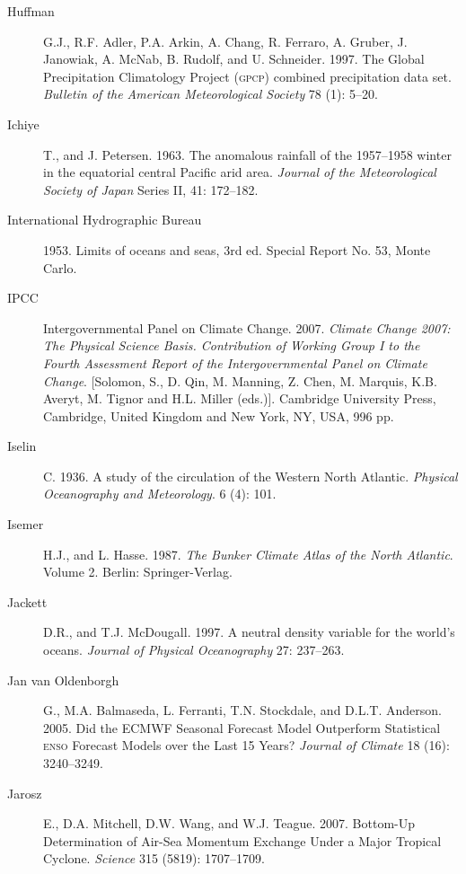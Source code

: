 \begin{description}
\item[Huffman]G.J., R.F. Adler, P.A. Arkin, A. Chang, R. Ferraro, A. Gruber, J.
Janowiak, A. McNab, B. Rudolf, and U. Schneider. 1997. The Global Precipitation
Climatology Project (\textsc{gpcp}) combined precipitation data set.
\textit{Bulletin of the American Meteorological Society} 78 (1): 5--20.

\item [Ichiye]T., and J. Petersen. 1963. The anomalous rainfall of the
1957--1958 winter in the equatorial central Pacific arid area. \textit{Journal of
the Meteorological Society of Japan} Series II, 41: 172--182.

\item [International Hydrographic Bureau]1953. Limits of oceans and seas, 3rd ed. Special Report No. 53, Monte Carlo.

\item [IPCC] Intergovernmental Panel on Climate Change. 2007. \textit{Climate Change 2007: The Physical Science Basis. Contribution of Working Group I to the Fourth Assessment Report of the Intergovernmental Panel on Climate Change}. [Solomon, S., D. Qin, M. Manning, Z. Chen, M. Marquis, K.B. Averyt, M. Tignor and H.L. Miller (eds.)]. Cambridge University Press, Cambridge, United Kingdom and New York, NY, USA, 996 pp. 

\item [Iselin]C. 1936. A study of the circulation of the Western North Atlantic.
\textit{Physical Oceanography and Meteorology}. 6 (4): 101.

\item [Isemer]H.J., and L. Hasse. 1987. \textit{The Bunker Climate Atlas of the
North Atlantic}. Volume 2.  Berlin: Springer-Verlag.

\item [Jackett]D.R., and T.J. McDougall. 1997. A neutral density variable for
the world's oceans. \textit{Journal of Physical Oceanography} 27: 237--263.

\item [Jan van Oldenborgh] G., M.A. Balmaseda, L. Ferranti, T.N. Stockdale, and D.L.T. Anderson. 2005. Did the ECMWF Seasonal Forecast Model Outperform Statistical \textsc{enso} Forecast Models over the Last 15 Years? \textit{Journal of Climate} 18 (16): 3240--3249.

\item [Jarosz]E., D.A. Mitchell, D.W. Wang, and W.J. Teague. 2007. Bottom-Up Determination of Air-Sea Momentum Exchange Under a Major Tropical Cyclone. \textit{Science} 315 (5819): 1707--1709.


\end{description}
